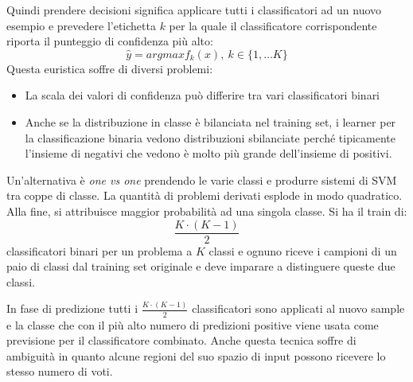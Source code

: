 Quindi prendere decisioni significa applicare tutti i classificatori ad un nuovo esempio e prevedere l'etichetta $k$ per la quale il classificatore corrispondente riporta il punteggio di confidenza più alto:
\begin{equation}
    \hat{y} = argmax f_k(x), \ k \in \{1,\dots K\}
\end{equation}
Questa euristica soffre di diversi problemi:
\begin{itemize}
    \item La scala dei valori di confidenza può differire tra vari classificatori binari
    \item Anche se la distribuzione in classe è bilanciata nel training set, i learner per la classificazione binaria vedono distribuzioni sbilanciate perché tipicamente l'insieme di negativi che vedono è molto più grande dell'insieme di positivi.
\end{itemize}
Un'alternativa è \textit{one vs one} prendendo le varie classi e produrre sistemi di SVM tra coppe di classe. La quantità di problemi derivati esplode in modo
quadratico. Alla fine, si attribuisce maggior probabilità ad una singola classe. Si ha il train di:
\begin{equation}
    \frac{K \cdot (K - 1)}{2}
\end{equation}
classificatori binari per un problema a $K$ classi e ognuno riceve i campioni di un paio di classi dal training set originale e deve imparare a distinguere queste due classi.

In fase di predizione tutti i $\frac{K \cdot (K - 1)}{2}$ classificatori sono applicati al nuovo sample e la classe che con il più alto numero di predizioni positive viene usata come previsione per il classificatore combinato. Anche questa tecnica soffre di ambiguità in quanto alcune regioni del suo spazio di input possono ricevere lo stesso numero di voti.